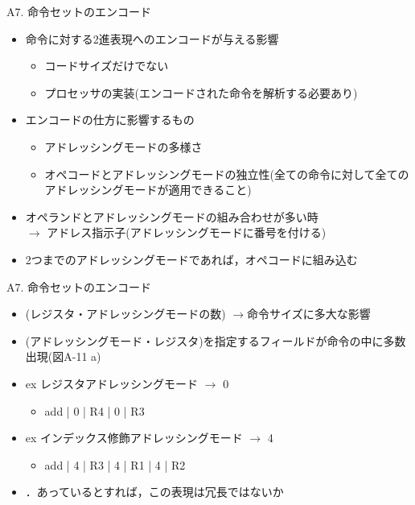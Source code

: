 \documentclass[dvipdfmx]{beamer}
\begin{document}
	\begin{frame}{}
		\titlepage
	\end{frame}

	\AtBeginSection[]
	{
	\begin{frame}{}
			\tableofcontents[currentsection,currentsubsection,sectionstyle=show/shaded,subsectionstyle=show/shaded]
	\end{frame}
	}

	\begin{frame}{A7. 命令セットのエンコード}
		\begin{itemize}
			\item 命令に対する2進表現へのエンコードが与える影響
				\begin{itemize}
					\item コードサイズだけでない
					\item プロセッサの実装(エンコードされた命令を解析する必要あり)
				\end{itemize}
			\item エンコードの仕方に影響するもの
				\begin{itemize}
					\item アドレッシングモードの多様さ
					\item オペコードとアドレッシングモードの独立性(全ての命令に対して全てのアドレッシングモードが適用できること)
				\end{itemize}
			\item オペランドとアドレッシングモードの組み合わせが多い時\\
				$\to$ アドレス指示子(アドレッシングモードに番号を付ける)
			\item 2つまでのアドレッシングモードであれば，オペコードに組み込む
		\end{itemize}
	\end{frame}

	\begin{frame}{A7. 命令セットのエンコード}
		\begin{itemize}
			\item (レジスタ・アドレッシングモードの数) $\to$命令サイズに多大な影響
			\item (アドレッシングモード・レジスタ)を指定するフィールドが命令の中に多数出現(図A-11 a)
			\item ex レジスタアドレッシングモード $\to$ 0
				\begin{itemize}
					\item add | 0 | R4 | 0 | R3
				\end{itemize}
			\item ex インデックス修飾アドレッシングモード $\to$ 4
				\begin{itemize}
					\item add | 4 | R3 | 4 | R1 | 4 | R2
				\end{itemize}
			\item {}．あっているとすれば，この表現は冗長ではないか
		\end{itemize}
	\end{frame}
\end{document}
